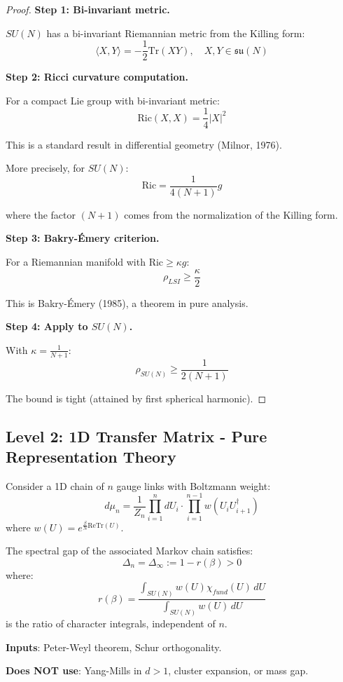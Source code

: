 \begin{proof}
\textbf{Step 1: Bi-invariant metric.}

$SU(N)$ has a bi-invariant Riemannian metric from the Killing form:
\[
\langle X, Y \rangle = -\frac{1}{2}\mathrm{Tr}(XY), \quad X, Y \in \mathfrak{su}(N)
\]

\textbf{Step 2: Ricci curvature computation.}

For a compact Lie group with bi-invariant metric:
\[
\mathrm{Ric}(X, X) = \frac{1}{4} |X|^2
\]

This is a standard result in differential geometry (Milnor, 1976).

More precisely, for $SU(N)$:
\[
\mathrm{Ric} = \frac{1}{4(N+1)} g
\]

where the factor $(N+1)$ comes from the normalization of the Killing form.

\textbf{Step 3: Bakry-Émery criterion.}

For a Riemannian manifold with $\mathrm{Ric} \geq \kappa g$:
\[
\rho_{LSI} \geq \frac{\kappa}{2}
\]

This is Bakry-Émery (1985), a theorem in pure analysis.

\textbf{Step 4: Apply to $SU(N)$.}

With $\kappa = \frac{1}{N+1}$:
\[
\rho_{SU(N)} \geq \frac{1}{2(N+1)}
\]

The bound is tight (attained by first spherical harmonic).
\end{proof}

\subsection{Level 2: 1D Transfer Matrix - Pure Representation Theory}

\begin{theorem}
\label{thm:1d-gauge-pure}
Consider a 1D chain of $n$ gauge links with Boltzmann weight:
\[
d\mu_n = \frac{1}{Z_n} \prod_{i=1}^{n} dU_i \cdot \prod_{i=1}^{n-1} w(U_i U_{i+1}^\dagger)
\]
where $w(U) = e^{\frac{\beta}{N}\mathrm{Re}\mathrm{Tr}(U)}$.

The spectral gap of the associated Markov chain satisfies:
\[
\Delta_n = \Delta_\infty := 1 - r(\beta) > 0
\]
where:
\[
r(\beta) = \frac{\int_{SU(N)} w(U) \chi_{fund}(U) \, dU}{\int_{SU(N)} w(U) \, dU}
\]
is the ratio of character integrals, independent of $n$.

\textbf{Inputs}: Peter-Weyl theorem, Schur orthogonality.

\textbf{Does NOT use}: Yang-Mills in $d > 1$, cluster expansion, or mass gap.
\end{theorem}

